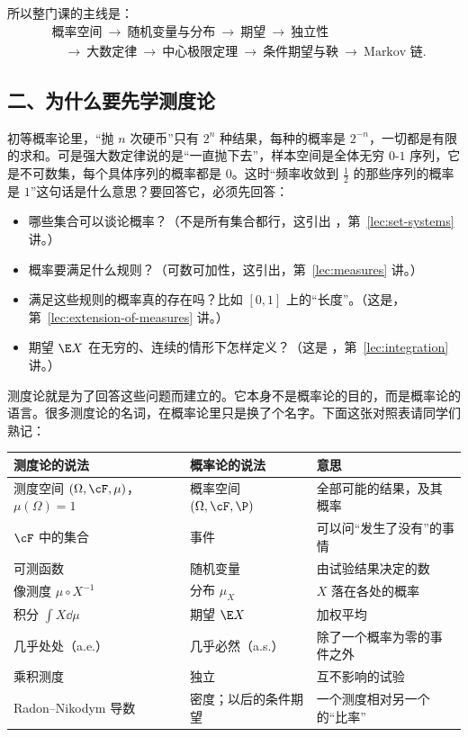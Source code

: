 所以整门课的主线是：
\[
\begin{aligned}
&\text{概率空间}\ \to\ \text{随机变量与分布}\ \to\ \text{期望}\ \to\ \text{独立性}\\
&\quad\to\ \text{大数定律}\ \to\ \text{中心极限定理}\ \to\ \text{条件期望与鞅}\ \to\ \text{Markov 链}.
\end{aligned}
\]

\subsection*{二、为什么要先学测度论}

初等概率论里，“抛 $n$ 次硬币”只有 $2^n$ 种结果，每种的概率是 $2^{-n}$，一切都是有限的求和。可是强大数定律说的是“一直抛下去”，样本空间是全体无穷 $0$-$1$ 序列，它是不可数集，每个具体序列的概率都是 $0$。这时“频率收敛到 $\frac12$ 的那些序列的概率是 $1$”这句话是什么意思？要回答它，必须先回答：
\begin{itemize}
\item 哪些集合可以谈论概率？（不是所有集合都行，这引出 ，第~\ref{lec:set-systems} 讲。）
\item 概率要满足什么规则？（可数可加性，这引出，第~\ref{lec:measures} 讲。）
\item 满足这些规则的概率真的存在吗？比如 $[0,1]$ 上的“长度”。（这是，第~\ref{lec:extension-of-measures} 讲。）
\item 期望 $\E X$ 在无穷的、连续的情形下怎样定义？（这是 ，第~\ref{lec:integration} 讲。）
\end{itemize}
测度论就是为了回答这些问题而建立的。它本身不是概率论的目的，而是概率论的语言。很多测度论的名词，在概率论里只是换了个名字。下面这张对照表请同学们熟记：

\begin{center}
\small
\begin{tabular}{p{14.5em}p{10.5em}p{11em}}
\toprule
测度论的说法 & 概率论的说法 & 意思\\
\midrule
测度空间 $(\Omega,\cF,\mu)$，$\mu(\Omega)=1$ & 概率空间 $(\Omega,\cF,\P)$ & 全部可能的结果，及其概率\\
$\cF$ 中的集合 & 事件 & 可以问“发生了没有”的事情\\
可测函数 & 随机变量 & 由试验结果决定的数\\
像测度 $\mu\circ X^{-1}$ & 分布 $\mu_X$ & $X$ 落在各处的概率\\
积分 $\int X\dd\mu$ & 期望 $\E X$ & 加权平均\\
几乎处处（a.e.） & 几乎必然（a.s.） & 除了一个概率为零的事件之外\\
乘积测度 & 独立 & 互不影响的试验\\
Radon--Nikodym 导数 & 密度；以后的条件期望 & 一个测度相对另一个的“比率”\\
\bottomrule
\end{tabular}
\end{center}

